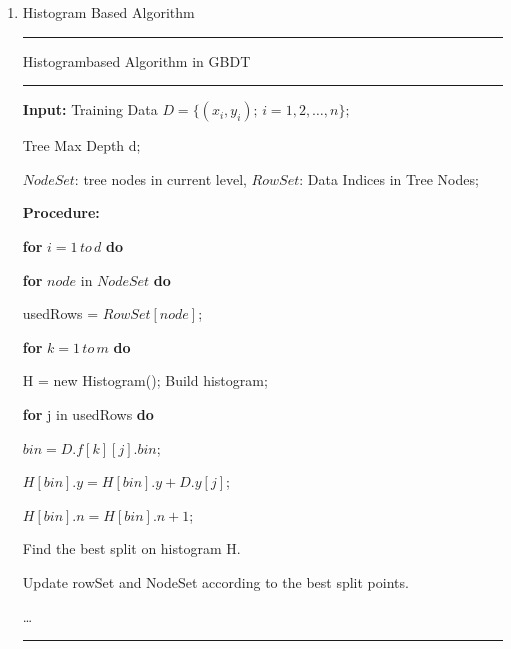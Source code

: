 \documentclass[a4paper]{article}
\begin{document}
\begin{enumerate}
			\item Histogram Based Algorithm\par
				\noindent\rule[0.10\baselineskip]{\textwidth}{0.5pt}\par
				Histogram\-based Algorithm in GBDT\\
				\noindent\rule[0.10\baselineskip]{\textwidth}{0.5pt}
						\textbf{Input:} Training Data $D=\{(x_i,y_i);\, i = 1,2,\dots, n\};$\par
						\hspace*{32pt} Tree Max Depth d;\par
						\hspace*{32pt} $NodeSet$: tree nodes in current level, $RowSet$: Data Indices in Tree Nodes;\par
						\textbf{Procedure:}\par
						\hspace*{32pt} \textbf{for} $i = 1\, to\, d$ \textbf{do}\par
						\hspace*{48pt} \textbf{for} $node$ in $NodeSet$ \textbf{do}\par
						\hspace*{64pt}	usedRows = $RowSet[node]$;\par
						\hspace*{64pt}  \textbf{for} $k = 1\,to\,m$ \textbf{do}\par
						\hspace*{80pt}	H = new Histogram(); Build histogram;\par
						\hspace*{80pt}  \textbf{for} j in usedRows \textbf{do}\par
						\hspace*{96pt}  $bin = D.f[k][j].bin$;\par
						\hspace*{96pt}  $H[bin].y = H[bin].y + D.y[j]$;\par
						\hspace*{96pt}  $H[bin].n = H[bin].n + 1$;\par
						\hspace*{80pt}  Find the best split on histogram H.\par
						\hspace*{48pt}  Update rowSet and NodeSet according to the best split points.\par 
						\hspace*{48pt}  \dots\par 
				\noindent\rule[0.10\baselineskip]{\textwidth}{0.75pt}\par

\end{enumerate}
\end{document}
